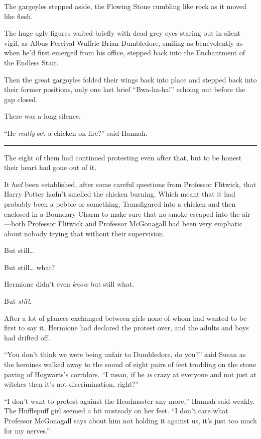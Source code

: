 The gargoyles stepped aside, the Flowing Stone rumbling like rock as it
moved like flesh.

The huge ugly figures waited briefly with dead grey eyes staring out in
silent vigil, as Albus Percival Wulfric Brian Dumbledore, smiling as
benevolently as when he'd first emerged from his office, stepped back
into the Enchantment of the Endless Stair.

Then the great gargoyles folded their wings back into place and stepped
back into their former positions, only one last brief ``Bwa-ha-ha!''
echoing out before the gap closed.

There was a long silence.

``He \emph{really} set a chicken on fire?'' said Hannah.

\begin{center}\rule{3in}{0.4pt}\end{center}

The eight of them had continued protesting even after that, but to be
honest their heart had gone out of it.

It \emph{had} been established, after some careful questions from
Professor Flitwick, that Harry Potter hadn't smelled the chicken
burning. Which meant that it had probably been a pebble or something,
Transfigured into a chicken and then enclosed in a Boundary Charm to
make sure that no smoke escaped into the air---both Professor Flitwick
and Professor McGonagall had been very emphatic about nobody trying that
without their supervision.

But still\ldots{}

But still\ldots{} what?

Hermione didn't even \emph{know} but still what.

But \emph{still}.

After a lot of glances exchanged between girls none of whom had wanted
to be first to say it, Hermione had declared the protest over, and the
adults and boys had drifted off.

``You don't think we were being unfair to Dumbledore, do you?'' said
Susan as the heroines walked away to the sound of eight pairs of feet
trodding on the stone paving of Hogwarts's corridors. ``I mean, if he
\emph{is} crazy at everyone and not just at witches then it's not
discrimination, right?''

``I don't want to protest against the Headmaster any more,'' Hannah said
weakly. The Hufflepuff girl seemed a bit unsteady on her feet. ``I don't
care what Professor McGonagall says about him not holding it against us,
it's just too much for my nerves.''


